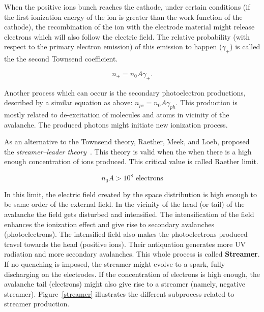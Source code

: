 When the positive ions bunch reaches the cathode, under certain conditions (if the first ionization energy of the ion is greater than the work function of the cathode), the recombination of the ion with the electrode material might release electrons which will also follow the electric field. The relative probability (with respect to the primary electron emission) of this emission to happen ($\gamma_{+}$) is called the the second Townsend coefficient.
 
\begin{equation}
    n_{+}=n_{0} A \gamma_{+}.
\end{equation}

Another process which can occur is the secondary photoelectron productions, described by a similar equation as above: $n_{pe}=n_{0} A \gamma_{ph}$. This production is mostly related to de-excitation of molecules and atoms in vicinity of the avalanche. The produced photons might initiate new ionization process.

As an alternative to the Townsend theory, Raether, Meek, and Loeb, proposed the \textit{streamer–leader theory}~\cite{streamer_leader_theory}. This theory is valid when the when there is a high enough concentration of ions produced. This critical value is called Raether limit.

\begin{equation}
    n_{0} A > 10^{8} \text{ electrons}
\end{equation}

In this limit, the electric field created by the space distribution is high enough to be same order of the external field. In the vicinity of the head (or tail) of the avalanche the field gets disturbed and intensified. The intensification of the field enhances the ionization effect and give rise to secondary avalanches (photoelectrons). The intensified field also makes the photoelectrons produced travel towards the head (positive ions). Their antiquation generates more UV radiation and more secondary avalanches. This whole process is called \textbf{Streamer}. If no quenching is imposed, the streamer might evolve to a spark, fully discharging on the electrodes. If the concentration of electrons is high enough, the avalanche tail (electrons) might also give rise to a streamer (namely, negative streamer). Figure~\ref{streamer} illustrates the different subprocess related to streamer production.

